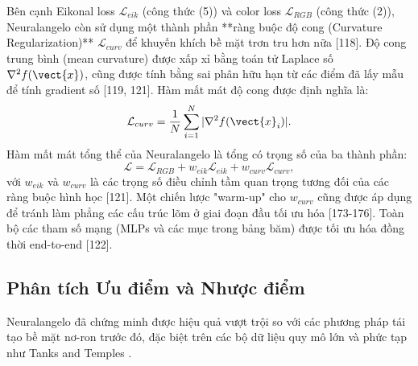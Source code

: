 Bên cạnh Eikonal loss $\mathcal{L}_{eik}$ (công thức (5)) và color loss $\mathcal{L}_{RGB}$ (công thức (2)), Neuralangelo còn sử dụng một thành phần **ràng buộc độ cong (Curvature Regularization)** $\mathcal{L}_{curv}$ để khuyến khích bề mặt trơn tru hơn nữa [118]. Độ cong trung bình (mean curvature) được xấp xỉ bằng toán tử Laplace số $\nabla^2 f(\vect{x})$, cũng được tính bằng sai phân hữu hạn từ các điểm đã lấy mẫu để tính gradient số [119, 121]. Hàm mất mát độ cong được định nghĩa là:
\begin{equation} \label{eq:curvature_loss}
\mathcal{L}_{curv} = \frac{1}{N} \sum_{i=1}^{N} |\nabla^2 f(\vect{x}_i)|.
\end{equation}
Hàm mất mát tổng thể của Neuralangelo là tổng có trọng số của ba thành phần:
\begin{equation} \label{eq:total_loss}
\mathcal{L} = \mathcal{L}_{RGB} + w_{eik}\mathcal{L}_{eik} + w_{curv}\mathcal{L}_{curv},
\end{equation}
với $w_{eik}$ và $w_{curv}$ là các trọng số điều chỉnh tầm quan trọng tương đối của các ràng buộc hình học [121]. Một chiến lược "warm-up" cho $w_{curv}$ cũng được áp dụng để tránh làm phẳng các cấu trúc lõm ở giai đoạn đầu tối ưu hóa [173-176]. Toàn bộ các tham số mạng (MLPs và các mục trong bảng băm) được tối ưu hóa đồng thời end-to-end [122].

\subsection{Phân tích Ưu điểm và Nhược điểm}
\label{subsec:neuralangelo_pros_cons}

Neuralangelo đã chứng minh được hiệu quả vượt trội so với các phương pháp tái tạo bề mặt nơ-ron trước đó, đặc biệt trên các bộ dữ liệu quy mô lớn và phức tạp như Tanks and Temples \cite{Knapitsch17Tanks}.

